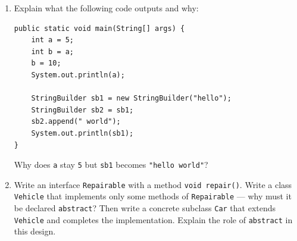\documentclass[twoside=false,DIV=14]{scrartcl}
\begin{document}
\begin{enumerate}
\item Explain what the following code outputs and why:
\begin{verbatim}
public static void main(String[] args) {
    int a = 5;
    int b = a;
    b = 10;
    System.out.println(a);

    StringBuilder sb1 = new StringBuilder("hello");
    StringBuilder sb2 = sb1;
    sb2.append(" world");
    System.out.println(sb1);
}
\end{verbatim}
Why does \texttt{a} stay \texttt{5} but \texttt{sb1} becomes \texttt{"hello world"}?

\item Write an interface \texttt{Repairable} with a method \texttt{void repair()}.  Write a class \texttt{Vehicle} that implements only some methods of \texttt{Repairable} --- why must it be declared \texttt{abstract}?  Then write a concrete subclass \texttt{Car} that extends \texttt{Vehicle} and completes the implementation.  Explain the role of \texttt{abstract} in this design.

\end{enumerate}
\end{document}
